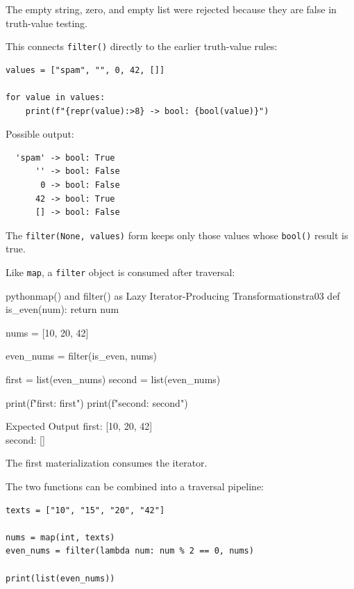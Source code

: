 \documentclass[a4paper,twoside]{report}
\begin{document}
The empty string, zero, and empty list were rejected because they are false in truth-value testing.

This connects \texttt{filter()} directly to the earlier truth-value rules:

\begin{verbatim}
values = ["spam", "", 0, 42, []]

for value in values:
    print(f"{repr(value):>8} -> bool: {bool(value)}")
\end{verbatim}

Possible output:

\begin{verbatim}
  'spam' -> bool: True
      '' -> bool: False
       0 -> bool: False
      42 -> bool: True
      [] -> bool: False
\end{verbatim}

The \texttt{filter(None, values)} form keeps only those values whose \texttt{bool()} result is true.

Like \texttt{map}, a \texttt{filter} object is consumed after traversal:

\begin{codebox}[]{python}{map() and filter() as Lazy Iterator-Producing Transformations}{tra03}
def is_even(num):
    return num %

nums = [10, 20, 42]

even_nums = filter(is_even, nums)

first = list(even_nums)
second = list(even_nums)

print(f"first: {first}")
print(f"second: {second}")
\end{codebox}


\begin{iobox}{Expected Output}
first: [10, 20, 42] \\
second: [] \\
\end{iobox}




The first materialization consumes the iterator.

The two functions can be combined into a traversal pipeline:

\begin{verbatim}
texts = ["10", "15", "20", "42"]

nums = map(int, texts)
even_nums = filter(lambda num: num % 2 == 0, nums)

print(list(even_nums))
\end{verbatim}
\end{document}
